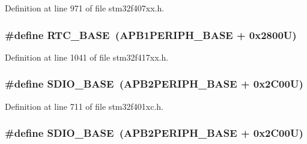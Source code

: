 Definition at line 971 of file stm32f407xx.\+h.

\subsubsection[{\texorpdfstring{R\+T\+C\+\_\+\+B\+A\+SE}{RTC_BASE}}]{\setlength{\rightskip}{0pt plus 5cm}\#define R\+T\+C\+\_\+\+B\+A\+SE~({\bf A\+P\+B1\+P\+E\+R\+I\+P\+H\+\_\+\+B\+A\+SE} + 0x2800\+U)}\hypertarget{group___peripheral__registers__structures_ga4265e665d56225412e57a61d87417022}{}\label{group___peripheral__registers__structures_ga4265e665d56225412e57a61d87417022}


Definition at line 1041 of file stm32f417xx.\+h.

\subsubsection[{\texorpdfstring{S\+D\+I\+O\+\_\+\+B\+A\+SE}{SDIO_BASE}}]{\setlength{\rightskip}{0pt plus 5cm}\#define S\+D\+I\+O\+\_\+\+B\+A\+SE~({\bf A\+P\+B2\+P\+E\+R\+I\+P\+H\+\_\+\+B\+A\+SE} + 0x2\+C00\+U)}\hypertarget{group___peripheral__registers__structures_ga95dd0abbc6767893b4b02935fa846f52}{}\label{group___peripheral__registers__structures_ga95dd0abbc6767893b4b02935fa846f52}


Definition at line 711 of file stm32f401xc.\+h.

\subsubsection[{\texorpdfstring{S\+D\+I\+O\+\_\+\+B\+A\+SE}{SDIO_BASE}}]{\setlength{\rightskip}{0pt plus 5cm}\#define S\+D\+I\+O\+\_\+\+B\+A\+SE~({\bf A\+P\+B2\+P\+E\+R\+I\+P\+H\+\_\+\+B\+A\+SE} + 0x2\+C00\+U)}\hypertarget{group___peripheral__registers__structures_ga95dd0abbc6767893b4b02935fa846f52}{}\label{group___peripheral__registers__structures_ga95dd0abbc6767893b4b02935fa846f52}


